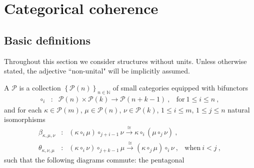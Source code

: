 
\section{Categorical coherence} 
\label{s:catoperads}

 
\subsection{Basic definitions}
\label{ss:def-catoperads}

Throughout this section we consider structures without units.
Unless otherwise stated, the adjective ``non-unital" will be implicitly assumed. 

\begin{definition} 
\label{def:catoperad}
A  $\mathcal{P}$ is a collection $\left\{  \mathcal{P}(n)  \right\}_{n\in \mathbb{N}}$ of small categories equipped with bifunctors  
$$ \begin{array}{clll}
\circ_i&\colon& \mathcal{P}(n) \times
                    \mathcal{P}(k)
                    \longrightarrow \mathcal{P}(n+k-1) \ ,
                    & \text{for}\ 1 \leq i \leq n \ ,
\end{array}  $$
and for each $\kappa \in \mathcal{P}(m)$,  $\mu \in \mathcal{P}(n)$, $\nu \in \mathcal{P}(k)$, $1 \leq i \leq m$, $1 \leq j \leq n$ natural isomorphisms 
$$ \begin{array}{clll}
    \beta_{\kappa,\mu,\nu}&\colon& 
    (\kappa \circ_i \mu) \circ_{j+i-1} \nu  \overset{\cong}{\longrightarrow} \kappa \circ_i (\mu \circ_j \nu) \ , &  \\
    \theta_{\kappa,\nu,\mu}&\colon& 
    (\kappa \circ_i \nu) \circ_{j+k-1} \mu 
    \overset{\cong}{\longrightarrow} (\kappa \circ_j \mu) \circ_i \nu \ , & \text{when}\ i < j \ , 
\end{array}  $$
such that the following diagrams commute: the pentagonal \\
\begin{center}
\end{center}
\end{definition}
